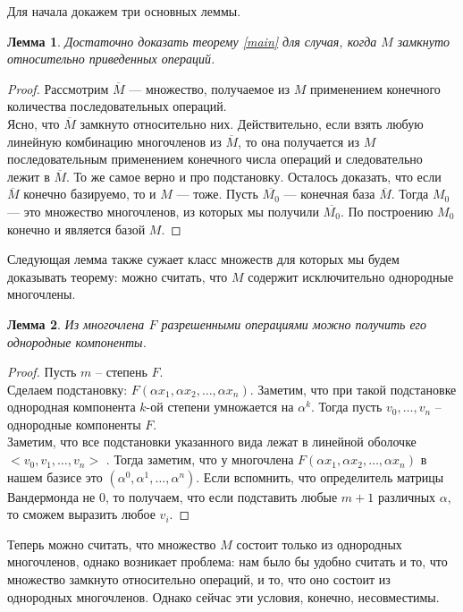 \documentclass[12pt,a4paper]{article}
\newtheorem{lemma}{Лемма}[section]
\begin{document}
    Для начала докажем три основных леммы.\vskip 0.1in\noindent
    \begin{lemma}
        \label{closure}
        Достаточно доказать теорему \ref{main} для случая, когда $M$ замкнуто относительно приведенных операций.
    \end{lemma}
    \begin{proof}
        Рассмотрим $\overline{M}$ --- множество, получаемое из $M$ применением конечного количества последовательных операций.\\
        Ясно, что $\overline{M}$ замкнуто относительно них. Действительно, если взять любую линейную комбинацию многочленов из $\overline{M}$, то она получается из $M$ последовательным применением конечного числа операций и следовательно лежит в $\overline{M}$. То же самое верно и про подстановку.
        Осталось доказать, что если $\overline{M}$ конечно базируемо, то и $M$ --- тоже. Пусть $\overline{M_0}$ --- конечная база $\overline{M}$. Тогда $M_0$ --- это множество многочленов, из которых мы получили $\overline{M_0}$. По построению $M_0$ конечно и является базой $M$.
    \end{proof}
    Следующая лемма также сужает класс множеств для которых мы будем доказывать теорему: можно считать, что $M$ содержит исключительно однородные многочлены.\vskip 0.1in\noindent
    \begin{lemma}
        \label{homogen}
        Из многочлена $F$ разрешенными операциями можно получить его однородные компоненты.
    \end{lemma}
    \begin{proof}
        Пусть $m$ -- степень $F$.\\
        Сделаем подстановку: $F(\alpha x_1, \alpha x_2, \ldots, \alpha x_n)$. Заметим, что при такой подстановке однородная компонента $k$-ой степени умножается на $\alpha^k$. Тогда пусть $v_0,\ldots,v_n$ -- однородные компоненты $F$. \\
        Заметим, что все подстановки указанного вида лежат в линейной оболочке $<v_0,v_1,\ldots,v_n>$ . Тогда заметим, что у многочлена $F(\alpha x_1, \alpha x_2, \ldots, \alpha x_n)$ в нашем базисе это $(\alpha^0,\alpha^1,\ldots,\alpha^n)$. Если вспомнить, что определитель матрицы Вандермонда не $0$, то получаем, что если подставить любые $m+1$ различных $\alpha$, то сможем выразить любое $v_i$.
    \end{proof}
    Теперь можно считать, что множество $M$ состоит только из однородных многочленов, однако возникает проблема: нам было бы удобно считать и то, что множество замкнуто относительно операций, и то, что оно состоит из однородных многочленов. Однако сейчас эти условия, конечно, несовместимы.\\
\end{document}
